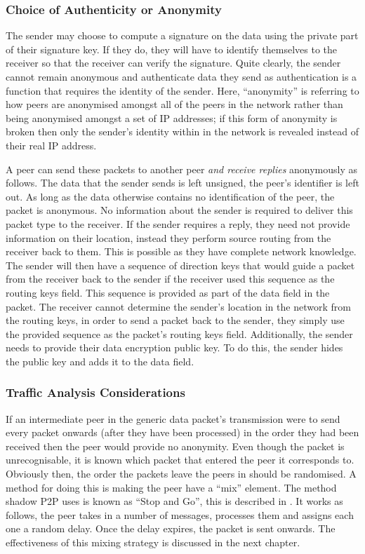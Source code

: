 \documentclass[ %
                    author={Luke Murray},
                supervisor={Dr. Simon Hollis},
                     title={Shadow Peer-to-Peer Networks},
                  subtitle={},
                    degree={MEng},
                      year={2013} ]{thesis}
\begin{document}
\subsubsection{Choice of Authenticity or Anonymity}

The sender may choose to compute a signature on the data using the private part of their signature key. If they do, they will have to identify themselves to the receiver so that the receiver can verify the signature. Quite clearly, the sender cannot remain anonymous and authenticate data they send as authentication is a function that requires the identity of the sender. Here, ``anonymity'' is referring to how peers are anonymised amongst all of the peers in the network rather than being anonymised amongst a set of IP addresses; if this form of anonymity is broken then only the sender's identity within in the network is revealed instead of their real IP address.

A peer can send these packets to another peer {\em and receive replies} anonymously as follows. The data that the sender sends is left unsigned, the peer's identifier is left out. As long as the data otherwise contains no identification of the peer, the packet is anonymous. No information about the sender is required to deliver this packet type to the receiver. If the sender requires a reply, they need not provide information on their location, instead they perform source routing from the receiver back to them. This is possible as they have complete network knowledge. The sender will then have a sequence of direction keys that would guide a packet from the receiver back to the sender if the receiver used this sequence as the routing keys field. This sequence is provided as part of the data field in the packet. The receiver cannot determine the sender's location in the network from the routing keys, in order to send a packet back to the sender, they simply use the provided sequence as the packet's routing keys field. Additionally, the sender needs to provide their data encryption public key. To do this, the sender hides the public key and adds it to the data field.

\subsubsection{Traffic Analysis Considerations}

If an intermediate peer in the generic data packet's transmission were to send every packet onwards (after they have been processed) in the order they had been received then the peer would provide no anonymity. Even though the packet is unrecognisable, it is known which packet that entered the peer it corresponds to. Obviously then, the order the packets leave the peers in should be randomised. A method for doing this is making the peer have a ``mix'' element. The method shadow P2P uses is known as ``Stop and Go'', this is described in \cite{kesdogan1998stop}. It works as follows, the peer takes in a number of messages, processes them and assigns each one a random delay. Once the delay expires, the packet is sent onwards. The effectiveness of this mixing strategy is discussed in the next chapter.
\end{document}
